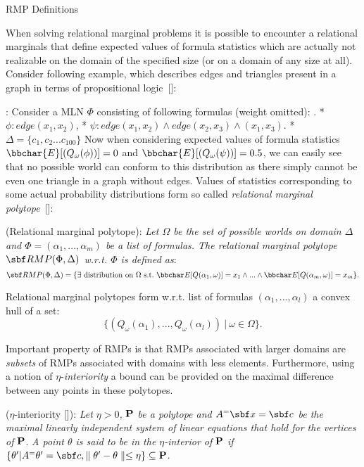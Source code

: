 \secc RMP Definitions
\par
When solving relational marginal problems it is possible to encounter a relational marginals that define expected values of formula statistics which are actually not realizable on the domain of the specified size (or on a domain of any size at all). Consider following example, which describes edges and triangles present in a graph in terms of propositional logic~[\rcite[KuzelkaKun]]:
\par\example : Consider a MLN $\Phi$ consisting of following formulas (weight omitted):
\begitems \style .
* $\phi: edge(x_1, x_2)$,
* $\psi: edge(x_1, x_2) \land edge(x_2, x_3) \land (x_1, x_3)$.
* $\Delta = \{c_1, c_2... c_{100}\}$
\enditems 
Now when considering expected values of formula statistics ${\bbchar{E}}[(Q_\omega(\phi))] = 0$ and ${\bbchar{E}}[(Q_\omega(\psi))] = 0.5$, we can easily see that no possible world can conform to this distribution as there simply cannot be even one triangle in a graph without edges. Values of statistics corresponding to some actual probability distributions form so called {\it relational marginal polytope}~[\rcite[KuzelkaAISTATS]]:
\par{} (Relational marginal polytope): {\it Let $\Omega$ be the set of possible worlds on domain $\Delta$ and $\Phi= (\alpha_1, ... , \alpha_m)$ be a list of formulas. The relational marginal polytope ${\sbf RMP}(\Phi, \Delta)$ w.r.t. $\Phi$ is defined as}:
$$ {\sbf RMP}(\Phi, \Delta) = \{
\exists {\rm ~distribution~on~} \Omega {\rm ~s.t.~} {\bbchar E}[Q(\alpha_1, \omega)] = x_1 \land ... \land {\bbchar E}[Q(\alpha_m, \omega)] = x_m \}.$$
\par 
Relational marginal polytopes form w.r.t. list of formulas $(\alpha_1, ..., \alpha_l)$ a convex hull of a set: 
$$\{(Q_\omega(\alpha_1), ..., Q_\omega(\alpha_l))~|~\omega \in \Omega \}.$$ 
\par Important property of RMPs is that RMPs associated with larger domains are {\it subsets} of RMPs associated with domains with less elements. Furthermore, using a notion of $\eta$-{\it interiority} a bound can be provided on the maximal difference between any points in these polytopes.
\par{} ($\eta$-interiority [\rcite[KuzelkaKun]]): {\it Let $\eta > 0$,} ${\bf P}$ {\it be a polytope and $A^={\sbf x} = {\sbf c}$ be the maximal linearly independent system of linear equations that hold for the vertices of} ${\bf P}$. {\it A point $\theta$ is said to be in the $\eta$-interior of} ${\bf P}$ {\it if $\{\theta' | A^= \theta' = {\sbf c}, \parallel\theta' - \theta\parallel \leq \eta\} \subseteq {\bf P}$}.

